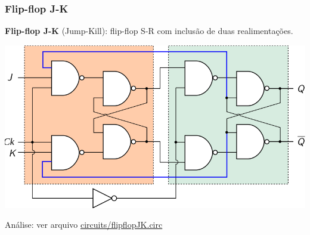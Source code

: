 \documentclass{beamer}
\begin{document}
\begin{frame}
\frametitle{Flip-flop J-K}

\textbf{Flip-flop J-K} (Jump-Kill): flip-flop S-R com inclusão de duas realimentações.

\vspace{12pt}

\hspace*{\fill}%
\includegraphics[scale=0.85]{images/flipflopJK2}
\hspace*{\fill}%

\vspace{6pt}

Análise: ver arquivo \url{circuits/flipflopJK.circ}
\end{frame}
\end{document}
